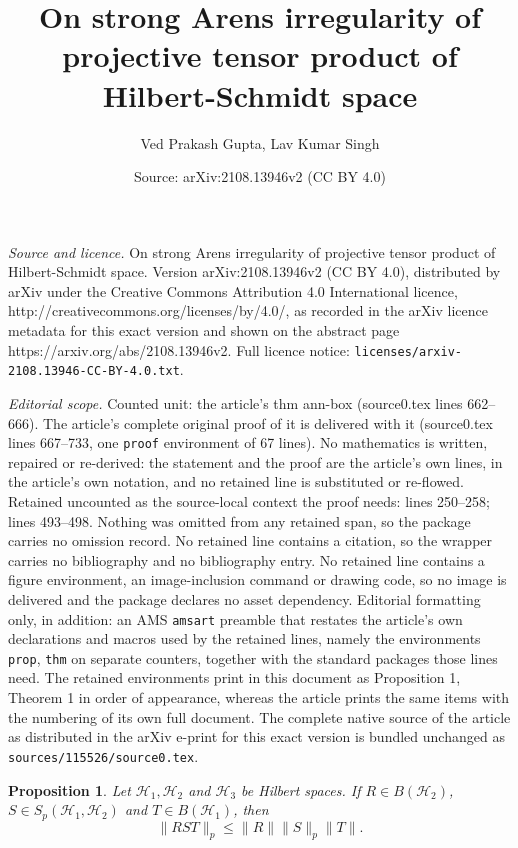 \documentclass[10pt,a4paper]{amsart}
\title{On strong Arens irregularity of projective tensor product of Hilbert-Schmidt space}
\author{Ved Prakash Gupta, Lav Kumar Singh}
\date{Source: arXiv:2108.13946v2 (CC BY 4.0)}
\newtheorem{prop}{Proposition}
\begin{document}
\maketitle

\noindent\emph{Source and licence.} On strong Arens irregularity of projective tensor product of Hilbert-Schmidt space. Version arXiv:2108.13946v2 (CC BY 4.0), distributed by arXiv under the Creative Commons Attribution 4.0 International licence, http://creativecommons.org/licenses/by/4.0/, as recorded in the arXiv licence metadata for this exact version and shown on the abstract page https://arxiv.org/abs/2108.13946v2. Full licence notice: \texttt{licenses/arxiv-2108.13946-CC-BY-4.0.txt}.\par\smallskip

\noindent\textit{Editorial scope.} Counted unit: the article's thm ann-box (source0.tex lines 662--666). The article's complete original proof of it is delivered with it (source0.tex lines 667--733, one \texttt{proof} environment of 67 lines). No mathematics is written, repaired or re-derived: the statement and the proof are the article's own lines, in the article's own notation, and no retained line is substituted or re-flowed.  Retained uncounted as the source-local context the proof needs: lines 250--258; lines 493--498.  Nothing was omitted from any retained span, so the package carries no omission record.  No retained line contains a citation, so the wrapper carries no bibliography and no bibliography entry.  No retained line contains a figure environment, an image-inclusion command or drawing code, so no image is delivered and the package declares no asset dependency.  Editorial formatting only, in addition: an AMS \texttt{amsart} preamble that restates the article's own declarations and macros used by the retained lines, namely the environments \texttt{prop}, \texttt{thm} on separate counters, together with the standard packages those lines need.  The retained environments print in this document as Proposition 1, Theorem 1 in order of appearance, whereas the article prints the same items with the numbering of its own full document.  The complete native source of the article as distributed in the arXiv e-print for this exact version is bundled unchanged as \texttt{sources/115526/source0.tex}.
\begin{prop}\label{Th:2.1}
	Let $\mathcal H_1,\mathcal H_2$ and $\mathcal H_3$ be Hilbert
        spaces. If $R\in B(\mathcal H_2)$, $S\in S_p(\mathcal
        H_1,\mathcal H_2)$ and $T\in B( \mathcal H_1)$,
        then
        \[
        \|RST\|_p\leq \|R\| \|S\|_p \|T\|.
        \]
\end{prop}
\end{document}
